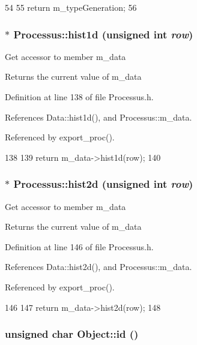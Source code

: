 \begin{DoxyCode}
54                        {
55     return m_typeGeneration;
56   }
\end{DoxyCode}
\hypertarget{classProcessus_a409227db936baff03c0462c1bcfe8069}{
\subsubsection[{hist1d}]{$\ast$ Processus::hist1d (unsigned int {\em row})}}
\label{classProcessus_a409227db936baff03c0462c1bcfe8069}
Get accessor to member m\_\-data \begin{DoxyReturn}{Returns}
the current value of m\_\-data 
\end{DoxyReturn}


Definition at line 138 of file Processus.h.

References Data::hist1d(), and Processus::m\_\-data.

Referenced by export\_\-proc().


\begin{DoxyCode}
138                                    {
139     return m_data->hist1d(row);
140   }
\end{DoxyCode}
\hypertarget{classProcessus_a73b5118cb5f2b5eaad33286183b86cfc}{
\subsubsection[{hist2d}]{$\ast$ Processus::hist2d (unsigned int {\em row})}}
\label{classProcessus_a73b5118cb5f2b5eaad33286183b86cfc}
Get accessor to member m\_\-data \begin{DoxyReturn}{Returns}
the current value of m\_\-data 
\end{DoxyReturn}


Definition at line 146 of file Processus.h.

References Data::hist2d(), and Processus::m\_\-data.

Referenced by export\_\-proc().


\begin{DoxyCode}
146                                    {
147     return m_data->hist2d(row);
148   }
\end{DoxyCode}
\hypertarget{classObject_af99145335cc61ff6e2798ea17db009d2}{
\subsubsection[{id}]{\setlength{\rightskip}{0pt plus 5cm}unsigned char Object::id ()}}
\label{classObject_af99145335cc61ff6e2798ea17db009d2}


